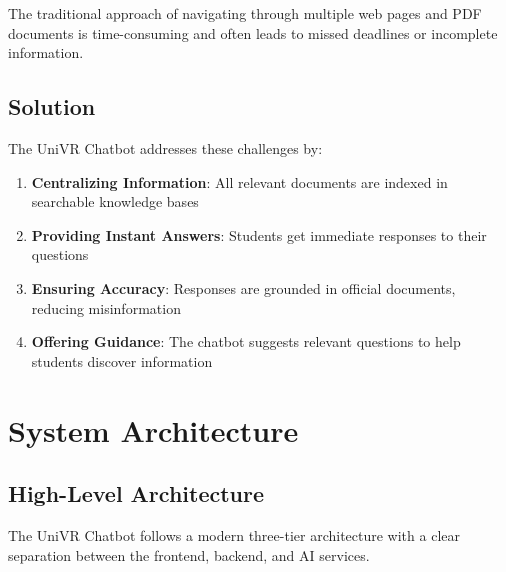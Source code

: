 \documentclass[12pt,a4paper]{article}
\begin{document}
The traditional approach of navigating through multiple web pages and PDF documents is time-consuming and often leads to missed deadlines or incomplete information.

\subsection{Solution}

The UniVR Chatbot addresses these challenges by:
\begin{enumerate}
    \item \textbf{Centralizing Information}: All relevant documents are indexed in searchable knowledge bases
    \item \textbf{Providing Instant Answers}: Students get immediate responses to their questions
    \item \textbf{Ensuring Accuracy}: Responses are grounded in official documents, reducing misinformation
    \item \textbf{Offering Guidance}: The chatbot suggests relevant questions to help students discover information
\end{enumerate}

\section{System Architecture}

\subsection{High-Level Architecture}

The UniVR Chatbot follows a modern three-tier architecture with a clear separation between the frontend, backend, and AI services.
\end{document}
